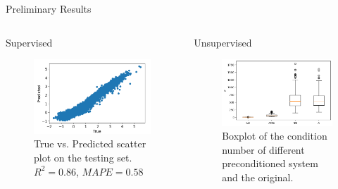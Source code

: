 \documentclass[aspectratio=169]{beamer}
\begin{document}
\begin{frame}{Preliminary Results}

    \begin{columns}
        \begin{column}[t]{.5\textwidth}
            Supervised 

            \begin{figure}
                \centering
                \includegraphics[width=\linewidth]{./figures/scatter_UNET_amg.png}
                \caption{True vs. Predicted scatter plot on the testing set. $R^2 = 0.86$, $MAPE = 0.58$}
            \end{figure}   
        \end{column}
        \begin{column}[t]{.5\textwidth}
            Unsupervised
            \begin{figure}
                \centering
                \includegraphics[width=\linewidth]{./figures/kappa-boxplot.png}
                \caption{Boxplot of the condition number of different preconditioned system and the original.}
            \end{figure}
        \end{column}
    \end{columns}
\end{frame}
\end{document}
